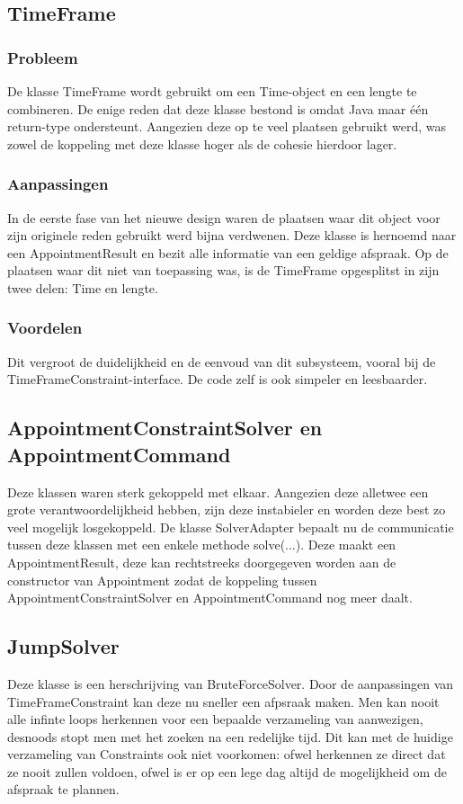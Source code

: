 \subsection{TimeFrame}
\subsubsection{Probleem}
De klasse TimeFrame wordt gebruikt om een Time-object en een lengte te combineren. 
De enige reden dat deze klasse bestond is omdat Java maar één return-type ondersteunt. 
Aangezien deze op te veel plaatsen gebruikt werd, was zowel de koppeling met deze klasse hoger als de cohesie hierdoor lager. 

\subsubsection{Aanpassingen}
In de eerste fase van het nieuwe design waren de plaatsen waar dit object voor zijn originele reden gebruikt werd bijna verdwenen. 
Deze klasse is hernoemd naar een AppointmentResult en bezit alle informatie van een geldige afspraak. 
Op de plaatsen waar dit niet van toepassing was, is de TimeFrame opgesplitst in zijn twee delen: Time en lengte.

\subsubsection{Voordelen}
Dit vergroot de duidelijkheid en de eenvoud van dit subsysteem, vooral bij de TimeFrameConstraint-interface. 
De code zelf is ook simpeler en leesbaarder. 

\subsection{AppointmentConstraintSolver en AppointmentCommand}
Deze klassen waren sterk gekoppeld met elkaar. 
Aangezien deze alletwee een grote verantwoordelijkheid hebben, zijn deze instabieler en worden deze best zo veel mogelijk losgekoppeld. 
De klasse SolverAdapter bepaalt nu de communicatie tussen deze klassen met een enkele methode solve(...). 
Deze maakt een AppointmentResult, deze kan rechtstreeks doorgegeven worden aan de constructor van Appointment zodat de koppeling tussen AppointmentConstraintSolver en AppointmentCommand nog meer daalt. 

\subsection{JumpSolver}
Deze klasse is een herschrijving van BruteForceSolver. 
Door de aanpassingen van TimeFrameConstraint kan deze nu sneller een afpsraak maken. 
Men kan nooit alle infinte loops herkennen voor een bepaalde verzameling van aanwezigen, desnoods stopt men met het zoeken na een redelijke tijd.
Dit kan met de huidige verzameling van Constraints ook niet voorkomen: ofwel herkennen ze direct dat ze nooit zullen voldoen, ofwel is er op een lege dag altijd de mogelijkheid om de afspraak te plannen.

